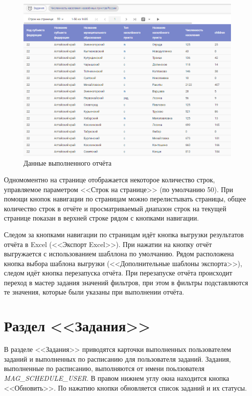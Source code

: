\documentclass[../user-manual.tex]{subfiles}
\begin{document}
	\begin{figure}[h]
		\centering
		\includegraphics[width=\graphicswidth]{img/6-report-data.png}
		\caption{Данные выполненного отчёта}
		\label{fig:report-data}
	\end{figure}	

	Одномоментно на странице отображается некоторое количество строк, управляемое параметром <<Строк на странице>> (по умолчанию 50). При помощи кнопок навигации по страницам можно перелистывать страницы, общее количество строк в отчёте и просматриваемый диапазон строк на текущей странице показан в верхней строке рядом с кнопками навигации.
	
	Следом за кнопками навигации по страницам идёт кнопка выгрузки результатов отчёта в Excel (<<Экспорт Excel>>). При нажатии на кнопку отчёт выгружается с использованием шабллона по умолчанию. Рядом расположена кнопка выбора шаблона выгрузки (<<Дополнительные шаблоны экспорта>>), следом идёт кнопка перезапуска отчёта. При перезапуске отчёта происходит переход в мастер задания значений фильтров, при этом в фильтры подставляются те значения, которые были указаны при выполнении отчёта.
	
	\section{Раздел <<Задания>>}
	
	В разделе <<Задания>> приводятся карточки выполненных пользователем заданий и выполненных по расписанию для пользователя заданий. Задания, выполненные по расписанию, выполняются от имени поьлзователя \textit{MAG\_SCHEDULE\_USER}. В правом нижнем углу окна находится кнопка <<Обновить>>. По нажатию кнопки обновляется список заданий и их статусы.
	
\end{document}

